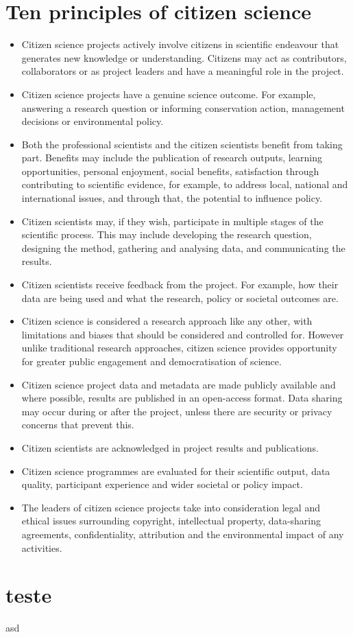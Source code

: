 \apendices 
\chapter{Ten principles of citizen science}
\label{app:ten-principles}

\begin{itemize}
    \item Citizen science projects actively involve citizens in scientific endeavour that generates new knowledge or understanding. 
    \subitem Citizens may act as contributors, collaborators or as project leaders and have a meaningful role in the project.
    \item Citizen science projects have a genuine science outcome. For example, answering a research question or informing conservation action, management decisions or environmental policy.
    \item Both the professional scientists and the citizen scientists benefit from taking part. Benefits may include the publication of research outputs, learning opportunities, personal enjoyment, social benefits, satisfaction through contributing to scientific evidence, for example, to address local, national and international issues, and through that, the potential to influence policy.
    \item Citizen scientists may, if they wish, participate in multiple stages of the scientific process. This may include developing the research question, designing the method, gathering and analysing data, and communicating the results.
    \item Citizen scientists receive feedback from the project. For example, how their data are being used and what the research, policy or societal outcomes are.
    \item Citizen science is considered a research approach like any other, with limitations and biases that should be considered and controlled for. However unlike traditional research approaches, citizen science provides opportunity for greater public engagement and democratisation of science.
    \item Citizen science project data and metadata are made publicly available and where possible, results are published in an open-access format. Data sharing may occur during or after the project, unless there are security or privacy concerns that prevent this.
    \item Citizen scientists are acknowledged in project results and publications.
    \item Citizen science programmes are evaluated for their scientific output, data quality, participant experience and wider societal or policy impact.
    \item The leaders of citizen science projects take into consideration legal and ethical issues surrounding copyright, intellectual property, data-sharing agreements, confidentiality, attribution and the environmental impact of any activities.
\end{itemize}

\chapter{teste}
asd
